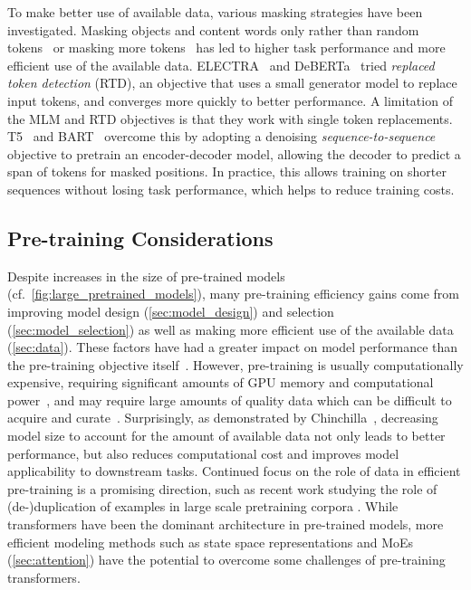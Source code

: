 To make better use of available data, various masking strategies have been investigated. Masking objects and content words only rather than random tokens~\citep{Bitton:2021} or masking more tokens~\citep{wettig2022should} has led to higher task performance and more efficient use of the available data. ELECTRA~\citep{Clark:2020} and DeBERTa~\citep{he2021debertav3} tried \textit{replaced token detection} (RTD), an objective that uses a small generator model to replace input tokens, and converges more quickly to better performance. A limitation of the MLM and RTD objectives is that they work with single token replacements. T5~\citep{raffel2019exploring} and BART~\cite{lewis-etal-2020-bart} overcome this by adopting a denoising \emph{sequence-to-sequence} objective to pretrain an encoder-decoder model, allowing the decoder to predict a span of tokens for masked positions. In practice, this allows training on shorter sequences without losing task performance, which helps to reduce training costs. 

\subsection{Pre-training Considerations} Despite increases in the size of pre-trained models (cf.~\ref{fig:large_pretrained_models}), many pre-training efficiency gains come from improving model design (\ref{sec:model_design}) and selection (\ref{sec:model_selection}) as well as making more efficient use of the available data (\ref{sec:data}).
These factors have had a greater impact on model performance than the pre-training objective itself~\citep{alajrami-aletras-2022-pre}. However, pre-training is usually computationally expensive, requiring significant amounts of GPU memory and computational power~\citep{rae2022scaling}, and may require large amounts of quality data which can be difficult to acquire and curate~\citep{kaplan2020scaling}. Surprisingly, as demonstrated by Chinchilla~\citep{Hoffmann2022}, decreasing model size to account for the amount of available data not only leads to better performance, but also reduces computational cost and improves model applicability to downstream tasks. Continued focus on the role of data in efficient pre-training is a promising direction, such as recent work studying the role of (de-)duplication of examples in large scale pretraining corpora \citep{lee-etal-2022-deduplicating}. While transformers have been the dominant architecture in pre-trained models, more efficient modeling methods such as state space representations and MoEs (\ref{sec:attention}) have the potential to overcome some challenges of pre-training transformers.

